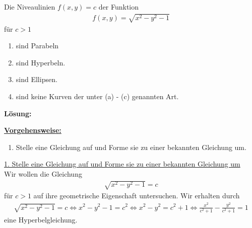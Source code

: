 \newpage

\subsection*{}
Die Niveaulinien $f(x,y) = c$ der Funktion
\begin{align*}
f(x,y) = \sqrt{x^2 - y^2 -1}
\end{align*}
für $c > 1$
\renewcommand{\labelenumi}{(\alph{enumi})}
\begin{enumerate}
\item sind Parabeln
\item sind Hyperbeln.
\item sind Ellipsen.
\item sind keine Kurven der unter (a) - (c) genannten Art.
\end{enumerate}


\textbf{Lösung:}
\begin{mdframed}
\underline{\textbf{Vorgehensweise:}}
\renewcommand{\labelenumi}{\theenumi.}
\begin{enumerate}
\item Stelle eine Gleichung auf und Forme sie zu einer bekannten Gleichung um.
\end{enumerate}
\end{mdframed}

\underline{1. Stelle eine Gleichung auf und Forme sie zu einer bekannten Gleichung um}\\
Wir wollen die Gleichung 
\begin{align*}
\sqrt{x^2 - y^2 -1} = c
\end{align*}
für $c > 1 $ auf ihre geometrische Eigenschaft untersuchen.
Wir erhalten durch
\begin{align*}
\sqrt{x^2 - y^2 -1} = c
\Leftrightarrow
x^2 - y^2 - 1 = c^2
\Leftrightarrow
x^2 - y^2 = c^2 +1
\Leftrightarrow
\frac{x^2}{c^2 + 1} - \frac{y^2}{c^2 + 1} = 1
\end{align*}
eine Hyperbelgleichung.

\newpage

